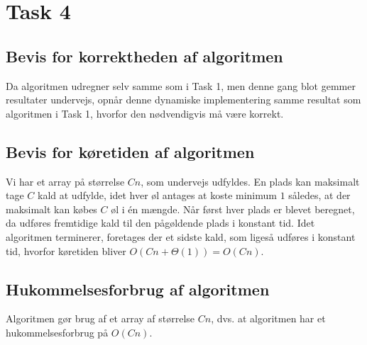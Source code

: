 \section{Task 4}
\subsection{Bevis for korrektheden af algoritmen}

Da algoritmen udregner selv samme som i Task 1, men denne gang blot gemmer resultater undervejs, opnår denne dynamiske implementering samme resultat som algoritmen i Task 1, hvorfor den nødvendigvis må være korrekt. 

\subsection{Bevis for køretiden af algoritmen}

Vi har et array på størrelse $Cn$, som undervejs udfyldes.
En plads kan maksimalt tage $C$ kald at udfylde, idet hver øl antages at koste minimum $1$ således, at der maksimalt kan købes $C$ øl i én mængde. 
Når først hver plads er blevet beregnet, da udføres fremtidige kald til den pågøldende plads i konstant tid. Idet algoritmen terminerer, foretages der et sidste kald, som ligeså udføres i konstant tid, hvorfor køretiden bliver $O(Cn+\Theta(1)) = O(Cn)$.

\subsection{Hukommelsesforbrug af algoritmen}
Algoritmen gør brug af et array af størrelse $Cn$, dvs.
at algoritmen har et hukommelsesforbrug på $O(Cn)$.

